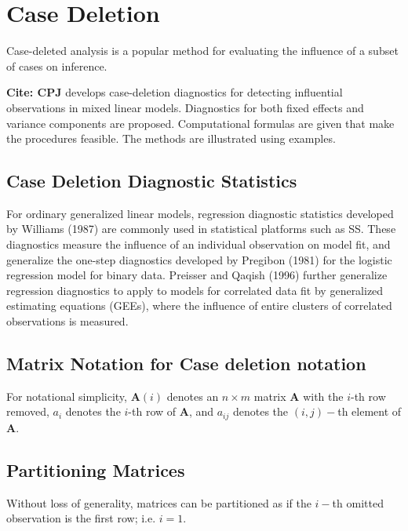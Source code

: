 \section{Case Deletion} %
Case-deleted analysis is a popular method for evaluating the inﬂuence of a subset of cases on inference.

\textbf{Cite: CPJ} develops case-deletion diagnostics for detecting influential observations in mixed linear models. Diagnostics for both fixed effects and variance components are proposed. Computational formulas are given that make the procedures feasible. The methods are illustrated using examples. 

\subsection{Case Deletion Diagnostic Statistics}

For ordinary generalized linear models, regression diagnostic statistics developed by Williams (1987) are commonly used in statistical platforms such as SS. These diagnostics measure the influence of an individual observation on model fit, and generalize the one-step diagnostics developed by Pregibon (1981) for the logistic regression model for binary data.
Preisser and Qaqish (1996) further generalize regression diagnostics to apply to models for correlated data fit by generalized estimating equations (GEEs), where the influence of entire clusters of correlated observations is measured.


\subsection{Matrix Notation for  Case deletion notation} %

For notational simplicity, $\boldsymbol{A}(i)$ denotes an $n \times m$ matrix $\boldsymbol{A}$ with the $i$-th row
removed, $a_i$ denotes the $i$-th row of $\boldsymbol{A}$, and $a_{ij}$ denotes the $(i, j)-$th element of $\boldsymbol{A}$.

\subsection{Partitioning Matrices} %
Without loss of generality, matrices can be partitioned as if the $i-$th omitted observation is the first row; i.e. $i=1$.

\newpage
